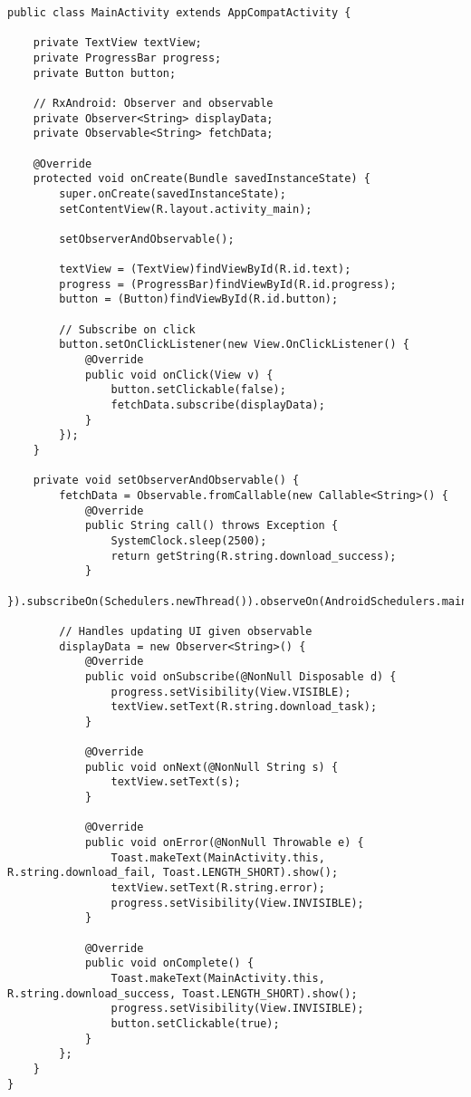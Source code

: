\begin{lstlisting}[style=A_Java, caption={Background task using RxAndroid}, label={listing:rxandr}]
public class MainActivity extends AppCompatActivity {

    private TextView textView;
    private ProgressBar progress;
    private Button button;

    // RxAndroid: Observer and observable
    private Observer<String> displayData;
    private Observable<String> fetchData;

    @Override
    protected void onCreate(Bundle savedInstanceState) {
        super.onCreate(savedInstanceState);
        setContentView(R.layout.activity_main);

        setObserverAndObservable();

        textView = (TextView)findViewById(R.id.text);
        progress = (ProgressBar)findViewById(R.id.progress);
        button = (Button)findViewById(R.id.button);

        // Subscribe on click
        button.setOnClickListener(new View.OnClickListener() {
            @Override
            public void onClick(View v) {
                button.setClickable(false);
                fetchData.subscribe(displayData);
            }
        });
    }

    private void setObserverAndObservable() {
        fetchData = Observable.fromCallable(new Callable<String>() {
            @Override
            public String call() throws Exception {
                SystemClock.sleep(2500);
                return getString(R.string.download_success);
            }
        }).subscribeOn(Schedulers.newThread()).observeOn(AndroidSchedulers.mainThread());

        // Handles updating UI given observable
        displayData = new Observer<String>() {
            @Override
            public void onSubscribe(@NonNull Disposable d) {
                progress.setVisibility(View.VISIBLE);
                textView.setText(R.string.download_task);
            }

            @Override
            public void onNext(@NonNull String s) {
                textView.setText(s);
            }

            @Override
            public void onError(@NonNull Throwable e) {
                Toast.makeText(MainActivity.this, R.string.download_fail, Toast.LENGTH_SHORT).show();
                textView.setText(R.string.error);
                progress.setVisibility(View.INVISIBLE);
            }

            @Override
            public void onComplete() {
                Toast.makeText(MainActivity.this, R.string.download_success, Toast.LENGTH_SHORT).show();
                progress.setVisibility(View.INVISIBLE);
                button.setClickable(true);
            }
        };
    }
}
\end{lstlisting}

